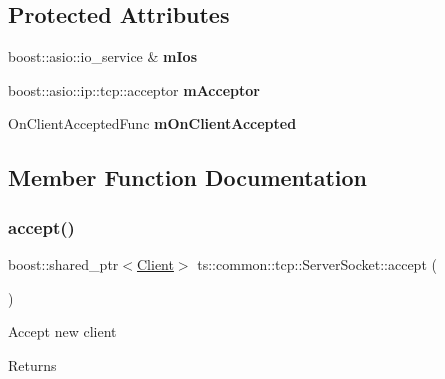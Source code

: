 \subsection*{Protected Attributes}
\begin{DoxyCompactItemize}
\item 
\mbox{\label{classts_1_1common_1_1tcp_1_1_server_socket_aec51a3d256cba7a66e94676af16274eb}} 
boost\+::asio\+::io\+\_\+service \& {\bfseries m\+Ios}
\item 
\mbox{\label{classts_1_1common_1_1tcp_1_1_server_socket_a13f2d4bfbca6aa875be15619e95c1e3c}} 
boost\+::asio\+::ip\+::tcp\+::acceptor {\bfseries m\+Acceptor}
\item 
\mbox{\label{classts_1_1common_1_1tcp_1_1_server_socket_a0d9cc76b5fb45b5cc97b7383855c1454}} 
On\+Client\+Accepted\+Func {\bfseries m\+On\+Client\+Accepted}
\end{DoxyCompactItemize}


\subsection{Member Function Documentation}
\mbox{\label{classts_1_1common_1_1tcp_1_1_server_socket_a08cd736bb403fddc15755c7f873ad83d}} 
\subsubsection{\texorpdfstring{accept()}{accept()}}
{\footnotesize\ttfamily boost\+::shared\+\_\+ptr$<$\hyperlink{classts_1_1_client}{Client}$>$ ts\+::common\+::tcp\+::\+Server\+Socket\+::accept (\begin{DoxyParamCaption}{ }\end{DoxyParamCaption})}

Accept new client \begin{DoxyReturn}{Returns}

\end{DoxyReturn}
\mbox{\label{classts_1_1common_1_1tcp_1_1_server_socket_aab226dbcb314136342551ac145c3fb92}} 
